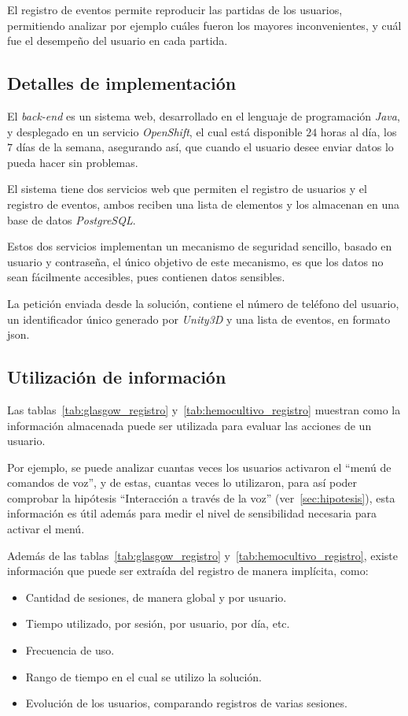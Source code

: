 El registro de eventos permite reproducir las partidas de los usuarios, permitiendo 
analizar por ejemplo cuáles fueron los mayores inconvenientes, y cuál fue el desempeño 
del usuario en cada partida.

\subsection{Detalles de implementación}

El \textit{back-end} es un sistema web, desarrollado en el lenguaje de programación \textit{Java}, y
desplegado en un servicio \textit{OpenShift}, el cual está
disponible $24$ horas al día, los $7$ días de la semana, asegurando así, que
cuando el usuario desee enviar datos lo pueda hacer sin problemas.

El sistema tiene dos servicios web que permiten el registro de usuarios y el
registro de eventos, ambos reciben una lista de elementos y los almacenan en una
base de datos \textit{PostgreSQL}.

Estos dos servicios implementan un mecanismo de seguridad sencillo, basado en
usuario y contraseña, el único objetivo de este mecanismo, es que los datos no
sean fácilmente accesibles, pues contienen datos sensibles.

La petición enviada desde la solución, contiene el número de teléfono del
usuario, un identificador único generado por \textit{Unity3D} y una lista de
eventos, en formato \Gls{json}.

\subsection{Utilización de información}

Las tablas~\ref{tab:glasgow_registro} y~\ref{tab:hemocultivo_registro} muestran
como la información almacenada puede ser utilizada para evaluar las acciones de
un usuario.

Por ejemplo, se puede analizar cuantas veces los usuarios activaron el 
\enquote{menú de comandos de voz}, y de estas, cuantas veces lo utilizaron, para así
poder comprobar la hipótesis \enquote{Interacción a través de la voz}
(ver~\ref{sec:hipotesis}), esta información es útil además para medir el
nivel de sensibilidad necesaria para activar el menú.

Además de las tablas~\ref{tab:glasgow_registro}
y~\ref{tab:hemocultivo_registro}, existe información que puede ser extraída del
registro de manera implícita, como:

\begin{itemize}
\item Cantidad de sesiones, de manera global y por usuario.
\item Tiempo utilizado, por sesión, por usuario, por día, etc.
\item Frecuencia de uso.
\item Rango de tiempo en el cual se utilizo la solución.
\item Evolución de los usuarios, comparando registros de varias sesiones.
\end{itemize}

